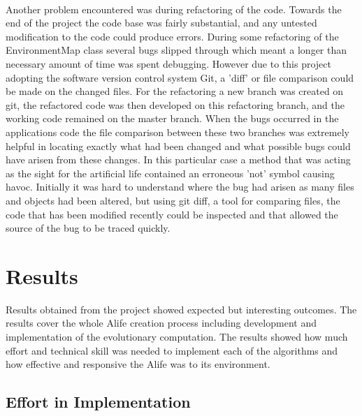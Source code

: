\documentclass[12pt]{article}
\begin{document}
\paragraph{}
Another problem encountered was during refactoring of the code. Towards the end of the project the code base was fairly substantial, and any
untested modification to the code could produce errors. During some refactoring of the EnvironmentMap class several bugs slipped through
which meant a longer than necessary amount of time was spent debugging. However due to this project adopting the software version control system
Git, a 'diff' or file comparison could be made on the changed files. For the refactoring a new branch was created on git, the refactored code
was then developed on this refactoring branch, and the working code remained on the master branch. When the bugs occurred in the
applications code the file comparison between these two branches was extremely helpful in locating exactly what had been changed and what
possible bugs could have arisen from these changes. In this particular case a method that was acting as the sight for the artificial life
contained an erroneous 'not' symbol causing havoc. Initially it was hard to understand where the bug had arisen as many files and objects had been
altered, but using git diff, a tool for comparing files, the code that has been modified recently could be inspected and that 
allowed the source of the bug to be traced quickly. 

\section{Results}

Results obtained from the project showed expected but interesting outcomes. The results cover the whole Alife creation process including
development and implementation of the evolutionary computation. The results showed how much effort and technical skill was needed to
implement each of the algorithms and how effective and responsive the Alife was to its environment.

\subsection{Effort in Implementation}
\end{document}

